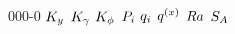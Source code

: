 \begin{mitframe}{000-0}
$\yeqconst$ \newline
$\acteqconst$ \newline
$\fugeqconst$ \newline
$\prob{i}$ \newline
$\charge{i}$ \newline
$\dufour$ \newline
$\rayleigh$ \newline
$\sa$ \newline

\end{mitframe}
